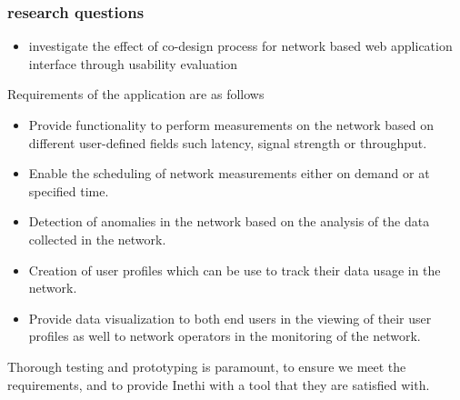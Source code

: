 \subsubsection{research questions}
\begin{itemize}
\item investigate the effect of co-design process for network based web application interface through usability evaluation
\end{itemize}
Requirements of the application are as follows 
\begin{itemize}
	\item Provide functionality to perform measurements on the network based on different user-defined fields such latency, signal strength or throughput.
	
	\item Enable the scheduling of network measurements either on demand or at specified time.  
	
	\item Detection of anomalies in the network based on the analysis of the data collected in the network.
	
	\item Creation of user profiles which can be use to track their data usage in the network. 
	
	\item Provide data visualization to both end users in the viewing of their user profiles as well to network operators in the monitoring of the network.
\end{itemize}
Thorough testing and prototyping is paramount, to ensure we meet the requirements, and to provide Inethi with a tool that they are satisfied with.
